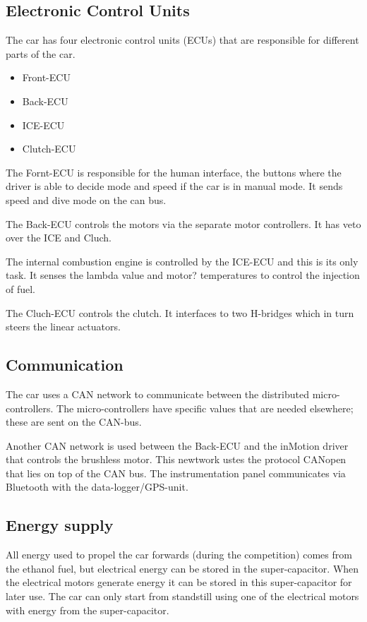 \subsection{Electronic Control Units}
The car has four electronic control units (ECUs) that are responsible for different parts of the car.

\begin{itemize}
\item Front-ECU
\item Back-ECU
\item ICE-ECU
\item Clutch-ECU
\end{itemize}

The Fornt-ECU is responsible for the human interface, the buttons where the driver is able to decide mode and speed if the car is in manual mode. It sends speed and dive mode on the can bus.

The Back-ECU controls the motors via the separate motor controllers. It has veto over the ICE and Cluch.

The internal combustion engine is controlled by the ICE-ECU and this is its only task. It senses the lambda value and motor? temperatures to control the injection of fuel.

The Cluch-ECU controls the clutch. It interfaces to two H-bridges which in turn steers the linear actuators.  

\subsection{Communication}
The car uses a CAN network to communicate between the distributed micro-controllers. The micro-controllers have specific values that are needed elsewhere; these are sent on the CAN-bus. 

Another CAN network is used between the Back-ECU and the inMotion driver that controls the brushless motor. This newtwork ustes the protocol CANopen that lies on top of the CAN bus.
The instrumentation panel communicates via Bluetooth with the data-logger/GPS-unit.

\subsection{Energy supply}
All energy used to propel the car forwards (during the competition) comes from the ethanol fuel, but electrical energy can be stored in the super-capacitor. When the electrical motors generate energy it can be stored in this super-capacitor for later use. The car can only start from standstill using one of the electrical motors with energy from the super-capacitor.  


